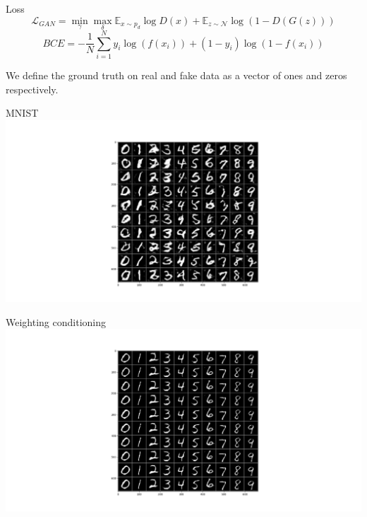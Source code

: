 \documentclass{beamer}
\begin{document}
\begin{frame}{Loss}
    \begin{equation}
        \mathcal{L}_{GAN} = \min_\gamma \max_\delta \mathbb{E}_{x \sim p_d} \log D(x) + \mathbb{E}_{z \sim \mathcal{N}} \log (1-D(G(z)))
    \end{equation}
    \begin{equation}
        BCE = -\frac{1}{N} \sum_{i=1}^N y_i \log (f(x_i)) + (1-y_i) \log (1-f(x_i))
    \end{equation}

    We define the ground truth on real and fake data as a vector of ones and zeros respectively.
\end{frame}

\begin{frame}{MNIST}
    \centering
    \includegraphics[scale=0.2]{images/mnist.png}
\end{frame}

\begin{frame}{Weighting conditioning}
    \centering
    \includegraphics[scale=0.2]{images/mnist-weighted.png}
\end{frame}
\end{document}
